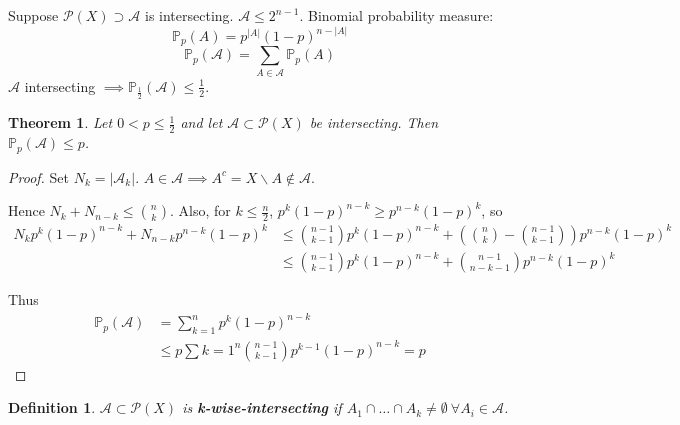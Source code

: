 \documentclass[a4paper]{article}
\newtheorem*{definition}{Definition}
\newtheorem{theorem}{Theorem}
\newcommand*\abs[1]{\left|#1\right|}
\begin{document}
Suppose $\mathcal{P}(X) \supset \mathcal{A}$ is intersecting.
$\mathcal{A} \leq 2^{n-1}$.
Binomial probability measure:
$$\mathbb{P}_p(A) = p^{\abs{A}}(1-p)^{n-\abs{A}}$$
$$\mathbb{P}_p(\mathcal{A}) = \sum_{A \in \mathcal{A}}\mathbb{P}_p(A)$$
$\mathcal{A}$ intersecting $\implies \mathbb{P}_{\frac{1}{2}}(\mathcal{A}) \leq \frac{1}{2}$.

\begin{theorem}
	Let $0<p\leq \frac{1}{2}$ and let $\mathcal{A} \subset \mathcal{P}(X)$ be intersecting.
	Then $\mathbb{P}_p(\mathcal{A}) \leq p$.
\end{theorem}
\begin{proof}
	Set $N_k = \abs{\mathcal{A}_k}$.
	$A \in \mathcal{A} \implies A^c = X\backslash A \not\in \mathcal{A}$.
	
	Hence $N_k + N_{n-k} \leq {n \choose k}$.
	Also, for $k \leq \frac{n}{2}$, $p^k(1-p)^{n-k} \geq p^{n-k}(1-p)^k$, so
	\begin{align*}
		N_kp^k(1-p)^{n-k} + N_{n-k}p^{n-k}(1-p)^k & \leq {n-1 \choose k-1}p^k(1-p)^{n-k} + \left({n \choose k} - {n-1 \choose k-1}\right)p^{n-k}(1-p)^k \\
		& \leq {n-1 \choose k-1}p^k(1-p)^{n-k} + {n-1 \choose n-k-1}p^{n-k}(1-p)^k
	\end{align*}
	
	Thus
	\begin{align*}
		\mathbb{P}_p(\mathcal{A}) &= \sum_{k=1}^n p^k(1-p)^{n-k} \\
		&\leq p \sum{k=1}^n {n-1 \choose k-1}p^{k-1}(1-p)^{n-k} = p
	\end{align*}
\end{proof}

\begin{definition}
	$\mathcal{A} \subset \mathcal{P}(X)$ is \textbf{k-wise-intersecting} if $A_1 \cap \dots \cap A_k \neq \emptyset\ \forall A_i \in \mathcal{A}$.
\end{definition}
\end{document}
